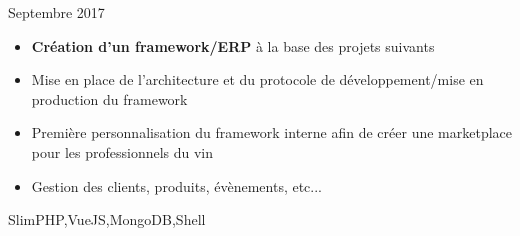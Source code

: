 \begin{experiences}
  {Septembre 2017}   {
                      \begin{itemize}
			\item \textbf{Création d'un framework/ERP} à la base des projets suivants
			\item Mise en place de l'architecture et du protocole de développement/mise en production du framework
			\item Première personnalisation du framework interne afin de créer une marketplace pour les professionnels du vin
			\item Gestion des clients, produits, évènements, etc...
		      \end{itemize}
                  }
                  {SlimPHP,VueJS,MongoDB,Shell}  
\end{experiences}
